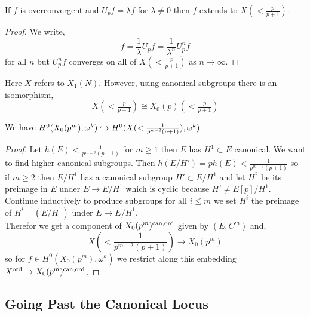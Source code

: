 \documentclass[12pt]{article}
\begin{document}
\begin{prop}
If $f$ is overconvergent and $U_p f = \lambda f$ for $\lambda \neq 0$ then $f$ extends to $X(< \frac{p}{p+1})$.
\end{prop}

\begin{proof}
We write,
\[ f = \frac{1}{\lambda} U_p f = \frac{1}{\lambda^n} U_p^n f \]
for all $n$ but $U_p^n f$ converges on all of $X(< \frac{p}{p+1})$ as $n \to \infty$. 
\end{proof}

\begin{rmk}
Here $X$ refers to $X_1(N)$. However, using canonical subgroups there is an isomorphism,
\[ X(< \tfrac{p}{p+1}) \cong X_0(p)(< \tfrac{p}{p+1}) \]
\end{rmk}

\begin{prop}
We have $H^0(X_0(p^m), \omega^k) \hookrightarrow H^0(X(<\frac{1}{p^{n-2}(p+1)}), \omega^k)$
\end{prop}

\begin{proof}
Let $h(E) < \frac{1}{p^{m-2}(p+1)}$ for $m \ge 1$ then $E$ has $H^1 \subset E$ canonical. We want to find higher canonical subgroups. Then $h(E/H') = p h(E) < \frac{1}{p^{m-3}(p+1)}$ so if $m \ge 2$ then $E/H^1$ has a canonical subgroup $H' \subset E / H^1$ and let $H^2$ be its preimage in $E$ under $E \to E / H^1$ which is cyclic because $H' \neq E[p] / H^1$. Continue inductively to produce subgroups for all $i \le m$ we set $H^i$ the preimage of $H^{i-1}(E/H^1)$ under $E \to E/H^1$. 
\bigskip\\
Therefor we get a component of $X_0(p^m)^{\mathrm{can}, \operatorname{\mathrm{ord}}}$ given by $(E, C^m)$ and,
\[ X(< \frac{1}{p^{m-2}(p+1)}) \to X_0(p^m) \]
so for $f \in H^0(X_0(p^m), \omega^k)$ we restrict along this embedding $X^{\operatorname{\mathrm{ord}}} \to X_0(p^m)^{\mathrm{can}, \operatorname{\mathrm{ord}}}$. 
\end{proof}

\subsection{Going Past the Canonical Locus}
\end{document}
